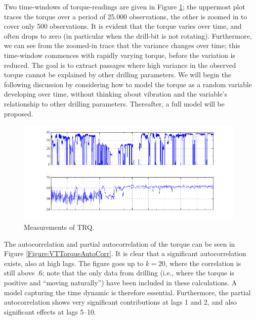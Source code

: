Two time-windows of torque-readings are given in Figure \ref{Figure:VTTorqueValues}; the uppermost plot traces the torque over a period of 25.000 observations, the other is zoomed in to cover only 500 observations. It is evident that the torque varies over time, and often drops to zero (in particular when the drill-bit is not rotating). Furthermore, we can see from the zoomed-in trace that the variance changes over time; this time-window commences with rapidly varying torque, before the variation is reduced. The goal is to extract passages where high variance in the observed torque cannot be explained by other drilling parameters. 
We will begin the following discussion by considering how to model the torque as a random variable developing over time, without thinking about vibration and the variable's relationship to other drilling parameters.   
Thereafter, a full model will be proposed.

\begin{figure}
\begin{center}
\includegraphics[scale=0.3]{./figures/VT_TRQ_values} 
\caption{\label{Figure:VTTorqueValues}  Measurements of TRQ.}
\end{center}
\end{figure}


The autocorrelation and partial autocorrelation of the torque can be seen in Figure \ref{Figure:VTTorqueAutoCorr}. It is clear that a significant autocorrelation exists, also at high lags. The figure goes up to $k=20$, where the correlation is still above .6; note that the only data from drilling (i.e., where the torque is positive and ``moving naturally'') have been included in these calculations. A model capturing the time dynamic is therefore essential. Furthermore, the partial autocorrelation shows very significant contributions at lags 1 and 2, and also significant effects at lags 5--10.  

